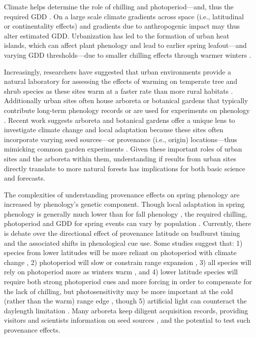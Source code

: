 \documentclass{article}\usepackage[]{graphicx}\usepackage[]{color}
\newcommand{\R}[1]{\label{#1}\linelabel{#1}}
\begin{document}
\R{Z1urban}Climate helps determine the role of chilling and photoperiod---and, thus the required GDD \citep{Bonhomme2000,Wu2022}. On a large scale climate gradients across space (i.e., latitudinal or continentality effects) and gradients due to anthropogenic impact may thus alter estimated GDD. Urbanization has led to the formation of urban heat islands, which can affect plant phenology and lead to earlier spring leafout---and varying GDD thresholds---due to smaller chilling effects through warmer winters \citep{Meng2020}.\R{Z1urbanend}


Increasingly, researchers have suggested that urban environments provide a natural laboratory for assessing the effects of warming on temperate tree and shrub species as these sites warm at a faster rate than more rural habitats \citep{Grimm2008,Pickett2011}. Additionally urban sites often house arboreta or botanical gardens that typically contribute long-term phenology records \citep{Zohner2014} or are used for experiments on phenology \citep{Ettinger2018}. Recent work suggests arboreta and botanical gardens offer a unique lens to investigate climate change and local adaptation because these sites often incorporate varying seed sources---or provenance (i.e., origin) locations---thus mimicking common garden experiments \citep{Primack2009}. Given these important roles of urban sites and the arboreta within them, understanding if results from urban sites directly translate to more natural forests has implications for both basic science and forecasts.  

The complexities of understanding provenance effects on spring phenology are increased by phenology's genetic component. Though local adaptation in spring phenology is generally much lower than for fall phenology \citep{McKown2013, Aitken2015, Vico2021}, the required chilling, photoperiod and GDD for spring events can vary by population \citep{Scotti2004,Cuervo-Alarcon2018,Wu2022}. Currently, there is debate over the directional effect of provenance latitude on budburst timing and the associated shifts in phenological cue use. Some studies suggest that: 1) species from lower latitudes will be more reliant on photoperiod with climate change \citep{Zohner2016}, 2) photoperiod will slow or constrain range expansion \citep{Saikkonen2012}, 3) all species will rely on photoperiod more as winters warm \citep{Way2015}, and 4) lower latitude species will require both strong photoperiod cues and more forcing in order to compensate for the lack of chilling, but photosensitivity may be more important at the cold (rather than the warm) range edge \citep{Gauzere2017}, though 5) artificial light can counteract the daylength limitation \citep{Meng2022}. Many arboreta keep diligent acquisition records, providing visitors and scientists information on seed sources \citep{Dosmann2006}, and the potential to test such provenance effects. 
  
\end{document}
